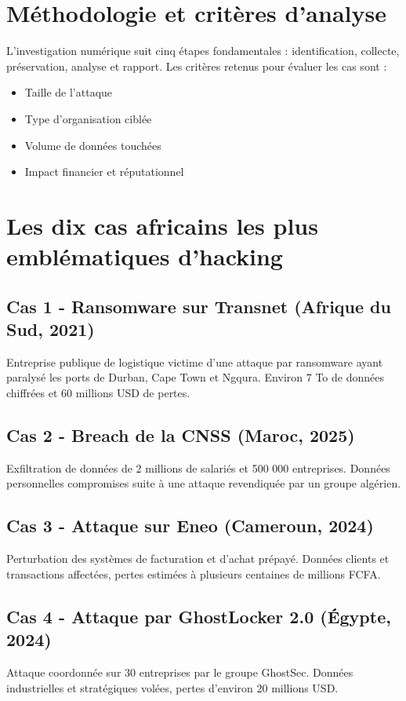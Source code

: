 \documentclass[12pt,a4paper]{article}
\begin{document}
\section{Méthodologie et critères d’analyse}
L’investigation numérique suit cinq étapes fondamentales : identification, collecte, préservation, analyse et rapport.  
Les critères retenus pour évaluer les cas sont :
\begin{itemize}
    \item Taille de l’attaque
    \item Type d’organisation ciblée
    \item Volume de données touchées
    \item Impact financier et réputationnel
\end{itemize}

\section{Les dix cas africains les plus emblématiques d’hacking}
\subsection*{Cas 1 - Ransomware sur Transnet (Afrique du Sud, 2021)}
Entreprise publique de logistique victime d’une attaque par ransomware ayant paralysé les ports de Durban, Cape Town et Ngqura. Environ 7 To de données chiffrées et 60 millions USD de pertes.

\subsection*{Cas 2 - Breach de la CNSS (Maroc, 2025)}
Exfiltration de données de 2 millions de salariés et 500 000 entreprises. Données personnelles compromises suite à une attaque revendiquée par un groupe algérien.

\subsection*{Cas 3 - Attaque sur Eneo (Cameroun, 2024)}
Perturbation des systèmes de facturation et d’achat prépayé. Données clients et transactions affectées, pertes estimées à plusieurs centaines de millions FCFA.

\subsection*{Cas 4 - Attaque par GhostLocker 2.0 (Égypte, 2024)}
Attaque coordonnée sur 30 entreprises par le groupe GhostSec. Données industrielles et stratégiques volées, pertes d’environ 20 millions USD.
\end{document}
